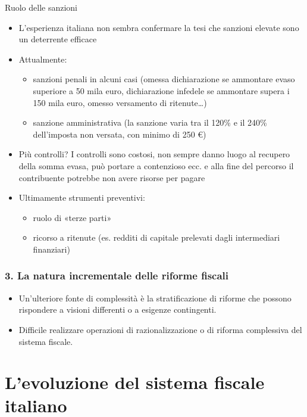 \documentclass[aspectratio=64,12pt]{beamer}
\begin{document}
\begin{frame}{Ruolo delle sanzioni}
\begin{itemize}
\item L'esperienza italiana non sembra confermare la tesi che sanzioni elevate
sono un deterrente efficace
\item Attualmente:
\begin{itemize}
\item sanzioni penali in alcuni casi (omessa dichiarazione se ammontare evaso
superiore a 50 mila euro, dichiarazione infedele se ammontare supera i 150
mila euro, omesso versamento di ritenute\ldots{})
\item sanzione amministrativa (la sanzione varia tra il 120\% e il 240\%
dell'imposta non versata, con minimo di 250 €)
\end{itemize}
\item Più controlli? I controlli sono costosi, non sempre danno luogo al recupero
della somma evasa, può portare a contenzioso ecc. e alla fine del percorso
il contribuente potrebbe non avere risorse per pagare
\item Ultimamente strumenti preventivi:
\begin{itemize}
\item ruolo di «terze parti»
\item ricorso a ritenute (es. redditi di capitale prelevati dagli intermediari
finanziari)
\end{itemize}
\end{itemize}
\end{frame}

\begin{frame}
  \frametitle{3. La natura incrementale delle riforme fiscali}

  \begin{resize}{1.1}
    \begin{itemize}
    \item Un'ulteriore fonte di complessità è la stratificazione di riforme che
      possono rispondere a visioni differenti o a esigenze contingenti.
    \item Difficile realizzare operazioni di razionalizzazione o di riforma
      complessiva del sistema fiscale.
    \end{itemize}
  \end{resize}
\end{frame}

\section{L'evoluzione del sistema fiscale italiano}
\end{document}
